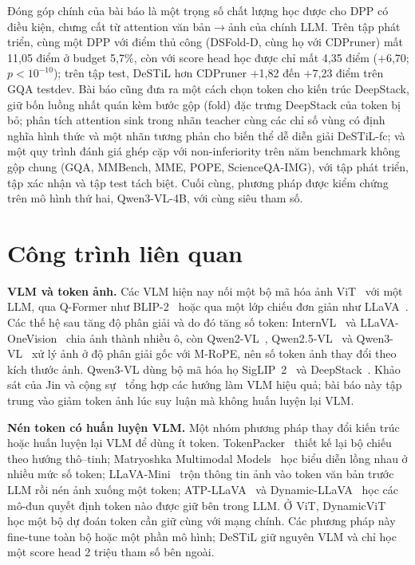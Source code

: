 \documentclass[conference]{IEEEtran}
\newcommand{\pl}{\ensuremath{+}}
\begin{document}
Đóng góp chính của bài báo là một trọng số chất lượng học được cho DPP có điều kiện, chưng cất từ attention văn bản$\rightarrow$ảnh của chính LLM. Trên tập phát triển, cùng một DPP với điểm thủ công (DSFold-D, cùng họ với CDPruner) mất 11,05 điểm ở budget 5,7\%, còn với score head học được chỉ mất 4,35 điểm (\pl6,70; $p<10^{-10}$); trên tập test, DeSTiL hơn CDPruner \pl1,82 đến \pl7,23 điểm trên GQA testdev. Bài báo cũng đưa ra một cách chọn token cho kiến trúc DeepStack, giữ bốn luồng nhất quán kèm bước gộp (fold) đặc trưng DeepStack của token bị bỏ; phân tích attention sink trong nhãn teacher cùng các chỉ số vùng có định nghĩa hình thức và một nhãn tương phản cho biến thể dễ diễn giải DeSTiL-fc; và một quy trình đánh giá ghép cặp với non-inferiority trên năm benchmark không gộp chung (GQA, MMBench, MME, POPE, ScienceQA-IMG), với tập phát triển, tập xác nhận và tập test tách biệt. Cuối cùng, phương pháp được kiểm chứng trên mô hình thứ hai, Qwen3-VL-4B, với cùng siêu tham số.

\section{Công trình liên quan}
\label{sec:related}

\textbf{VLM và token ảnh.} Các VLM hiện nay nối một bộ mã hóa ảnh ViT~\cite{dosovitskiy2021vit} với một LLM, qua Q-Former như BLIP-2~\cite{li2023blip2} hoặc qua một lớp chiếu đơn giản như LLaVA~\cite{liu2023llava,liu2024llava15}. Các thế hệ sau tăng độ phân giải và do đó tăng số token: InternVL~\cite{chen2024internvl} và LLaVA-OneVision~\cite{li2024llavaonevision} chia ảnh thành nhiều ô, còn Qwen2-VL~\cite{wang2024qwen2vl}, Qwen2.5-VL~\cite{bai2025qwen25vl} và Qwen3-VL~\cite{qwen2025qwen3vl} xử lý ảnh ở độ phân giải gốc với M-RoPE, nên số token ảnh thay đổi theo kích thước ảnh. Qwen3-VL dùng bộ mã hóa họ SigLIP~2~\cite{tschannen2025siglip2} và DeepStack~\cite{meng2024deepstack}. Khảo sát của Jin và cộng sự~\cite{jin2025survey} tổng hợp các hướng làm VLM hiệu quả; bài báo này tập trung vào giảm token ảnh lúc suy luận mà không huấn luyện lại VLM.

\textbf{Nén token có huấn luyện VLM.} Một nhóm phương pháp thay đổi kiến trúc hoặc huấn luyện lại VLM để dùng ít token. TokenPacker~\cite{li2024tokenpacker} thiết kế lại bộ chiếu theo hướng thô--tinh; Matryoshka Multimodal Models~\cite{cai2024matryoshka} học biểu diễn lồng nhau ở nhiều mức số token; LLaVA-Mini~\cite{zhang2025llavamini} trộn thông tin ảnh vào token văn bản trước LLM rồi nén ảnh xuống một token; ATP-LLaVA~\cite{ye2024atpllava} và Dynamic-LLaVA~\cite{huang2025dynamicllava} học các mô-đun quyết định token nào được giữ bên trong LLM. Ở ViT, DynamicViT~\cite{rao2021dynamicvit} học một bộ dự đoán token cần giữ cùng với mạng chính. Các phương pháp này fine-tune toàn bộ hoặc một phần mô hình; DeSTiL giữ nguyên VLM và chỉ học một score head 2 triệu tham số bên ngoài.
\end{document}
